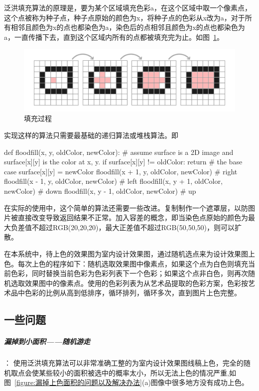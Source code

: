 泛洪填充算法的原理是，要为某个区域填充色彩a，在这个区域中取一个像素点，这个点被称为种子点，种子点原始的颜色为x，将种子点的色彩从x改为a，对于所有相邻且颜色为x的点也都染色为a，染色后的点相邻且颜色为x的点也都染色为a，一直传播下去，直到这个区域内所有的点都被填充完为止。如图~\ref{figure:填充过程}。

\begin{figure}[!htbp]
\centering
\includegraphics[width=\linewidth,keepaspectratio]{data/chapter-1/填充.jpg}
\caption{填充过程}
\label{figure:填充过程}
\end{figure}

实现这样的算法只需要最基础的递归算法或堆栈算法。即
\begin{python}
def floodfill(x, y, oldColor, newColor):
    # assume surface is a 2D image and surface[x][y] is the color at x, y.    
    if surface[x][y] != oldColor: return # the base case
    surface[x][y] = newColor
    floodfill(x + 1, y, oldColor, newColor) # right
    floodfill(x - 1, y, oldColor, newColor) # left
    floodfill(x, y + 1, oldColor, newColor) # down
    floodfill(x, y - 1, oldColor, newColor) # up
\end{python}

在实际的使用中，这个简单的算法还需要一些改进。复制制作一个遮罩层，以防图片被直接改变导致返回结果不正常。加入容差的概念，即当染色点原始的颜色为最大负差值不超过RGB(20,20,20)，最大正差值不超过RGB(50,50,50)，则可以扩散。

在本系统中，待上色的效果图为室内设计效果图，通过随机选点来为设计效果图上色。每次上色的程序如下：随机选取效果图中像素点，如果这个点为白色则填充当前色彩，同时替换当前色彩为色彩列表下一个色彩；如果这个点非白色，则再次随机选取效果图中的像素点。使用的色彩列表为从艺术品提取的色彩方案，色彩按艺术品中色彩的比例从高到低排序，循环排列，循环多次，直到图片上色完整。

\subsection{一些问题}

\subparagraph{漏掉到小面积——随机游走}：
使用泛洪填充算法可以非常准确工整的为室内设计效果图线稿上色，完全的随机取点会使某些较小的面积被选中的概率太小，所以无法上色的情况严重,如图~\ref{figure:漏掉上色面积的问题以及解决办法}(a)图像中很多地方没有成功上色。


